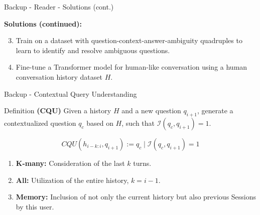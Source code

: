 \documentclass{beamer}
\begin{document}
\begin{frame}{Backup - Reader - Solutions (cont.)}

  \textbf{Solutions (continued):}

  \begin{enumerate}
    \setcounter{enumi}{2}
    \item Train on a dataset with question-context-answer-ambiguity quadruples to learn to identify and resolve ambiguous questions.
    \item Fine-tune a Transformer model for human-like conversation using a human conversation history dataset $H$.
  \end{enumerate}
  
\end{frame}


\begin{frame}{Backup - Contextual Query Understanding}

  \begin{block}{Definition}
    \textbf{(CQU)} Given a history $H$ and a new question $q_{i+1}$, generate a contextualized question $q_c$ based on $H$, such that $\mathcal{I}(q_c,q_{i+1}) = 1$. 
  \end{block}

  \begin{equation*}
    CQU(h_{i-k:i}, q_{i+1}) := q_c \mid \mathcal{I}(q_c, q_{i+1}) = 1
  \end{equation*}

  \bigskip

  \begin{enumerate}
    \item \textbf{K-many:} Consideration of the last $k$ turns.
    \item \textbf{All:} Utilization of the entire history, $k = i - 1$.
    \item \textbf{Memory:} Inclusion of not only the current history but also previous Sessions by this user.
  \end{enumerate} 
\end{frame}
\end{document}
